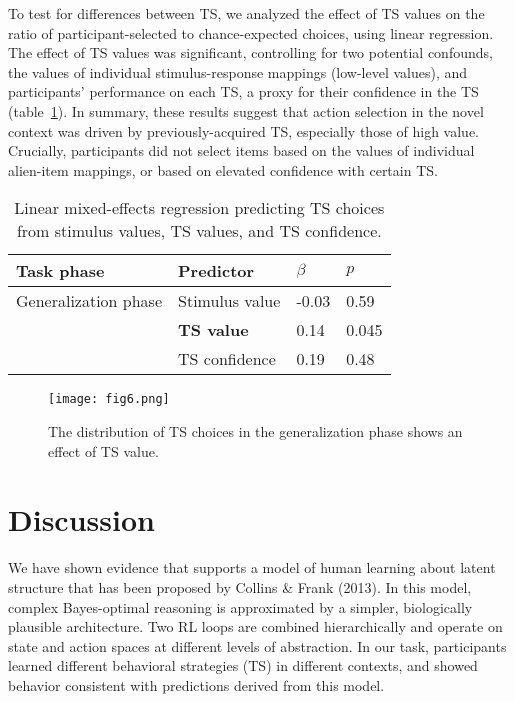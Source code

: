\documentclass[10pt, letterpaper]{article}
\begin{document}
To test for differences between TS, we analyzed the effect of TS values on the ratio of participant-selected to chance-expected choices, using linear regression. The effect of TS values was significant, controlling for two potential confounds, the values of individual stimulus-response mappings (low-level values), and participants' performance on each TS, a proxy for their confidence in the TS (table~\ref{table:TS creation}). In summary, these results suggest that action selection in the novel context was driven by previously-acquired TS, especially those of high value. Crucially, participants did not select items based on the values of individual alien-item mappings, or based on elevated confidence with certain TS. 

\begin{table}[!ht]
\begin{center} 
\caption{Linear mixed-effects regression predicting TS choices from stimulus values, TS values, and TS confidence.} 
\label{table:TS creation} 
\vskip 0.1in
\small{
\begin{tabular}{llll} 
\hline
Task phase          &   Predictor               &   $\beta$ &   $p$   \\
\hline
Generalization phase&   Stimulus value          &   -0.03   &   0.59  \\
                    &   {\bf TS value}          &   0.14    &   0.045 \\
                    &   TS confidence           &   0.19    &   0.48  \\
\hline
\end{tabular}
}
\end{center} 
\end{table}

\begin{figure}[ht]
    \begin{center}
	\texttt{[image: fig6.png]}
    \end{center}
    \caption{The distribution of TS choices in the generalization phase shows an effect of TS value.}
    \label{figure:TS creation distribution}
\end{figure}

\section{Discussion}

We have shown evidence that supports a model of human learning about latent structure that has been proposed by Collins \& Frank (2013). In this model, complex Bayes-optimal reasoning is approximated by a simpler, biologically plausible architecture. Two RL loops are combined hierarchically and operate on state and action spaces at different levels of abstraction. In our task, participants learned different behavioral strategies (TS) in different contexts, and showed behavior consistent with predictions derived from this model.
\end{document}
